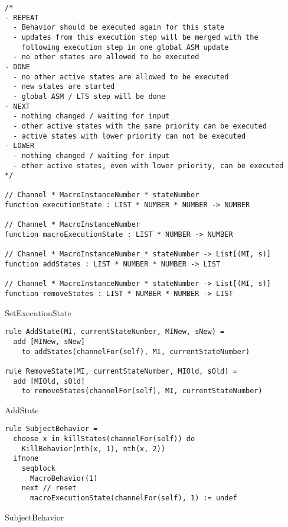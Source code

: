 \begin{listing}[H]
\begin{verbatim}
/*
- REPEAT
  - Behavior should be executed again for this state
  - updates from this execution step will be merged with the
    following execution step in one global ASM update
  - no other states are allowed to be executed
- DONE
  - no other active states are allowed to be executed
  - new states are started
  - global ASM / LTS step will be done
- NEXT
  - nothing changed / waiting for input
  - other active states with the same priority can be executed
  - active states with lower priority can not be executed
- LOWER
  - nothing changed / waiting for input
  - other active states, even with lower priority, can be executed
*/

// Channel * MacroInstanceNumber * stateNumber
function executionState : LIST * NUMBER * NUMBER -> NUMBER

// Channel * MacroInstanceNumber
function macroExecutionState : LIST * NUMBER -> NUMBER

// Channel * MacroInstanceNumber * stateNumber -> List[(MI, s)]
function addStates : LIST * NUMBER * NUMBER -> LIST

// Channel * MacroInstanceNumber * stateNumber -> List[(MI, s)]
function removeStates : LIST * NUMBER * NUMBER -> LIST
\end{verbatim}
\caption{SetExecutionState}
\label{lst:asm:SetExecutionState}
\end{listing}




\begin{listing}[H]
\begin{verbatim}
rule AddState(MI, currentStateNumber, MINew, sNew) =
  add [MINew, sNew]
    to addStates(channelFor(self), MI, currentStateNumber)

rule RemoveState(MI, currentStateNumber, MIOld, sOld) =
  add [MIOld, sOld]
    to removeStates(channelFor(self), MI, currentStateNumber)
\end{verbatim}
\caption{AddState}
\label{lst:asm:AddState}
\end{listing}







\begin{listing}[H]
\begin{verbatim}
rule SubjectBehavior =
  choose x in killStates(channelFor(self)) do
    KillBehavior(nth(x, 1), nth(x, 2))
  ifnone
    seqblock
      MacroBehavior(1)
    next // reset
      macroExecutionState(channelFor(self), 1) := undef
\end{verbatim}
\caption{SubjectBehavior}
\label{lst:asm:SubjectBehavior}
\end{listing}




